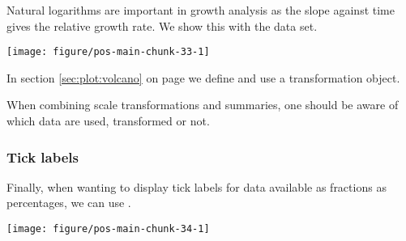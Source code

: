 \documentclass[krantz2]{krantz}\usepackage{knitr}%
\begin{document}
Natural logarithms are important in growth analysis as the slope against time gives the relative growth rate. We show this with the  data set.

\begin{knitrout}\footnotesize
{}\color{fgcolor}\begin{kframe}
\begin{alltt}
\hlstd{(} 
       \hlstd{(}      \hlopt{+}
  \hlstd{()} \hlopt{+}
  \hlstd{()} \hlopt{+}
  \hlstd{(} \hlstd{=} \hlstd{,}  \hlstd{=} \hlstd{(}\hlstd{,} \hlstd{,} \hlstd{,} \hlstd{))}
\end{alltt}
\end{kframe}

{\centering \texttt{[image: figure/pos-main-chunk-33-1]} 

}



\end{knitrout}

In section \ref{sec:plot:volcano} on page \pageref{sec:plot:volcano} we define and use a transformation object.

\begin{warningbox}
When combining scale transformations and summaries, one should be aware of which data are used, transformed or not.
\end{warningbox}

\subsubsection{Tick labels}

Finally, when wanting to display tick labels for data available as fractions as percentages, we can use
.

\begin{knitrout}\footnotesize
{}\color{fgcolor}\begin{kframe}
\begin{alltt}
  \hlopt{/}  \hlopt{+}
  \hlstd{()} \hlopt{+}
  \hlstd{(} \hlopt{::}
\end{alltt}
\end{kframe}

{\centering \texttt{[image: figure/pos-main-chunk-34-1]} 

}



\end{knitrout}
\end{document}
